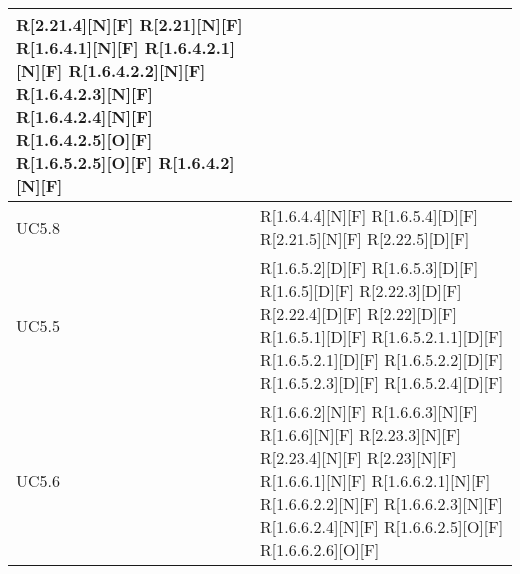 \begin{longtable}{X | X}
R[2.21.4][N][F] \newline
R[2.21][N][F] \newline
R[1.6.4.1][N][F] \newline
R[1.6.4.2.1][N][F] \newline
R[1.6.4.2.2][N][F] \newline
R[1.6.4.2.3][N][F] \newline
R[1.6.4.2.4][N][F] \newline
R[1.6.4.2.5][O][F] \newline
R[1.6.5.2.5][O][F] \newline
R[1.6.4.2][N][F]  \\
\hline
UC5.8 & R[1.6.4.4][N][F] \newline
R[1.6.5.4][D][F] \newline
R[2.21.5][N][F] \newline
R[2.22.5][D][F]  \\
\hline
UC5.5 & R[1.6.5.2][D][F] \newline
R[1.6.5.3][D][F] \newline
R[1.6.5][D][F] \newline
R[2.22.3][D][F] \newline
R[2.22.4][D][F] \newline
R[2.22][D][F] \newline
R[1.6.5.1][D][F] \newline
R[1.6.5.2.1.1][D][F] \newline
R[1.6.5.2.1][D][F] \newline
R[1.6.5.2.2][D][F] \newline
R[1.6.5.2.3][D][F] \newline
R[1.6.5.2.4][D][F]  \\
\hline
UC5.6 & R[1.6.6.2][N][F] \newline
R[1.6.6.3][N][F] \newline
R[1.6.6][N][F] \newline
R[2.23.3][N][F] \newline
R[2.23.4][N][F] \newline
R[2.23][N][F] \newline
R[1.6.6.1][N][F] \newline
R[1.6.6.2.1][N][F] \newline
R[1.6.6.2.2][N][F] \newline
R[1.6.6.2.3][N][F] \newline
R[1.6.6.2.4][N][F] \newline
R[1.6.6.2.5][O][F] \newline
R[1.6.6.2.6][O][F]  \\

\end{longtable}
